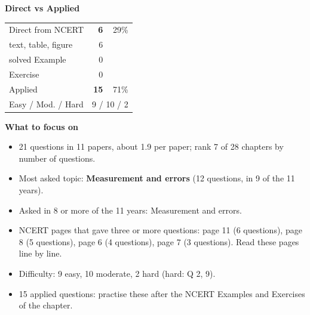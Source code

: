 \begin{minipage}[t]{0.34\linewidth}{\small\textbf{\color{crimson}Direct vs Applied}\par\smallskip
\begin{tabular}{@{}lrr@{}}\toprule
Direct from NCERT & \textbf{6} & 29\%\\
\quad text, table, figure & 6 &\\
\quad solved Example & 0 &\\
\quad Exercise & 0 &\\
Applied & \textbf{15} & 71\%\\\midrule
Easy / Mod. / Hard & \multicolumn{2}{r}{9 / 10 / 2}\\\bottomrule
\end{tabular}}\end{minipage}\hfill
\begin{minipage}[t]{0.63\linewidth}{\small\textbf{\color{crimson}What to focus on}\par\smallskip
\begin{itemize}[leftmargin=1.1em,itemsep=1pt,topsep=0pt]
\item 21 questions in 11 papers, about 1.9 per paper; rank 7 of 28 chapters by number of questions.
\item Most asked topic: \textbf{Measurement and errors} (12 questions, in 9 of the 11 years).
\item Asked in 8 or more of the 11 years: Measurement and errors.
\item NCERT pages that gave three or more questions: page 11 (6 questions), page 8 (5 questions), page 6 (4 questions), page 7 (3 questions). Read these pages line by line.
\item Difficulty: 9 easy, 10 moderate, 2 hard (hard: Q 2, 9).
\item 15 applied questions: practise these after the NCERT Examples and Exercises of the chapter.
\end{itemize}}\end{minipage}\par
{}
